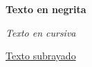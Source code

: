 \documentclass{article}
\begin{document}
\textbf{Texto en negrita}

\textit{Texto en cursiva}

\underline{Texto subrayado}
\end{document}
